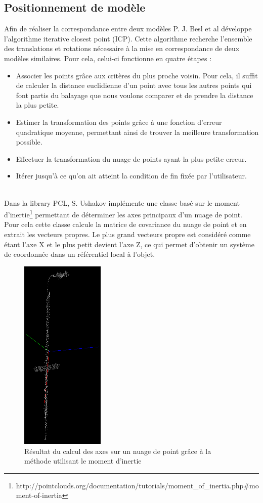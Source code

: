 \subsection{Positionnement de modèle}
Afin de réaliser la correspondance entre deux modèles P. J. Besl et al\cite{ICP} développe l'algorithme \og iterative closest point \fg (ICP).
Cette algorithme recherche l'ensemble des translations et rotations nécessaire à la mise en correspondance de deux modèles similaires. Pour cela,
celui-ci fonctionne en quatre étapes :
\begin{itemize}
  \item Associer les points grâce aux critères du plus proche voisin. Pour cela, il suffit de calculer la distance euclidienne d'un
   point avec tous les autres points qui font partis du balayage que nous voulons comparer et de prendre la distance la plus petite.
  \item Estimer la transformation des points grâce à une fonction d'erreur quadratique moyenne, permettant ainsi de trouver la meilleure
  transformation possible.
  \item Effectuer la transformation du nuage de points ayant la plus petite erreur.
  \item Itérer jusqu'à ce qu'on ait atteint la condition de fin fixée par l'utilisateur.
\end{itemize}
\ \\
Dans la library PCL\cite{PCL}, S. Ushakov implémente une classe basé sur le moment d'inertie\footnote{http://pointclouds.org/documentation/tutorials/moment\_of\_inertia.php\#moment-of-inertia}
permettant de déterminer les axes principaux d'un nuage de point. Pour cela cette classe calcule la matrice de covariance du nuage de point et 
en extrait les vecteurs propres. Le plus grand vecteurs propre est considéré comme étant l'axe X et le plus petit devient l'axe Z, ce qui permet 
d'obtenir un système de coordonnée dans un référentiel local à l'objet.\\   
\begin{figure}[!ht]
  \begin{center}
    \includegraphics[width=4cm]{image/objectAxis.png}
    \caption{Résultat du calcul des axes sur un nuage de point grâce à la méthode utilisant le moment d'inertie}
  \end{center}
\end{figure}

